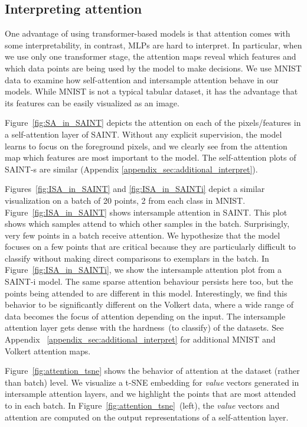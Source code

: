 \subsection{Interpreting attention}
\label{subsec:attention_analysis}
One advantage of using transformer-based models is that attention comes with some interpretability, in contrast, MLPs are hard to interpret. In particular, when we use only one transformer stage, the attention maps reveal which features and which data points are being used by the model to make decisions. We use MNIST data to examine how self-attention and intersample attention behave in our models. While MNIST is not a typical tabular dataset, it has the advantage that its features can be easily visualized as an image.

Figure~\ref{fig:SA_in_SAINT} depicts the attention on each of the pixels/features in a self-attention layer of SAINT. Without any explicit supervision, the model learns to focus on the foreground pixels, and we clearly see from the attention map which features are most important to the model. The self-attention plots of SAINT-s are similar (Appendix \ref{appendix_sec:additional_interpret}).

Figures~\ref{fig:ISA_in_SAINT} and \ref{fig:ISA_in_SAINTi} depict a similar visualization on a batch of 20 points, 2 from each class in MNIST. Figure~\ref{fig:ISA_in_SAINT} shows intersample attention in SAINT. This plot shows which samples attend to which other samples in the batch. Surprisingly, very few points in a batch receive attention. We hypothesize that the model focuses on a few points that are critical because they are particularly difficult to classify without making direct comparisons to exemplars in the batch. In Figure~\ref{fig:ISA_in_SAINTi}, we show the intersample attention plot from a SAINT-i model. The same sparse attention behaviour persists here too, but the points being attended to are different in this model. Interestingly, we find this behavior to be significantly different on the Volkert data, where a wide range of data becomes the focus of attention depending on the input. The intersample attention layer gets dense with the hardness~(to classify) of the datasets. See Appendix ~\ref{appendix_sec:additional_interpret} for additional MNIST and Volkert attention maps.

Figure~\ref{fig:attention_tsne} shows the behavior of attention at the dataset (rather than batch) level. We visualize a t-SNE \citep{van2008visualizing} embedding for \textit{value} vectors generated in intersample attention layers, and we highlight the points that are most attended to in each batch. In Figure~\ref{fig:attention_tsne}~(left), the \textit{value} vectors and attention are computed on the output representations of a self-attention layer. 

